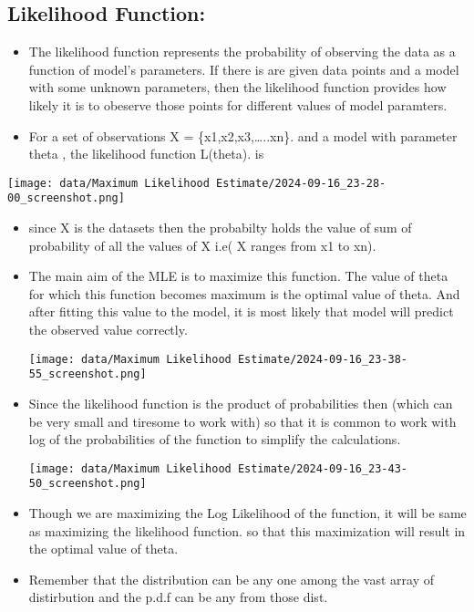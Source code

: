 \documentclass[11pt]{article}
\begin{document}
\subsection{Likelihood Function:}
\label{sec:org936ea10}
\begin{itemize}
\item The likelihood function represents the probability of observing the data as
a function of model's parameters. If there is are  given data points and a model
with some unknown parameters, then the likelihood function provides how likely
it is to obeserve those points for different values of model paramters.

\item For a set of observations X = \{x1,x2,x3,\ldots{}..xn\}. and a model with parameter
theta , the likelihood function L(theta). is
\end{itemize}


\begin{center}
\texttt{[image: data/Maximum Likelihood Estimate/2024-09-16\_23-28-00\_screenshot.png]}
\end{center}
\begin{itemize}
\item since X is the datasets then the probabilty holds the value of sum of probability
of all the values of X i.e( X ranges from x1 to xn).

\item The main aim of the MLE is to maximize this function. The value of theta for
which this function becomes maximum is the optimal value of theta. And after
fitting this value to the model, it is most likely that model will predict the
observed value correctly.
\begin{center}
\texttt{[image: data/Maximum Likelihood Estimate/2024-09-16\_23-38-55\_screenshot.png]}
\end{center}
\item Since the likelihood function is the product of probabilities then (which can
be very small and tiresome to work with) so that it is common to work with
log of the probabilities of the function to simplify the calculations.

\begin{center}
\texttt{[image: data/Maximum Likelihood Estimate/2024-09-16\_23-43-50\_screenshot.png]}
\end{center}
\item Though we are maximizing the Log Likelihood of the function, it will be same
as maximizing the likelihood function. so that this maximization will result
in the optimal value of theta.

\item Remember that the distribution can be any one among the vast array of distirbution
and the p.d.f can be any from those dist.
\end{itemize}
\end{document}
